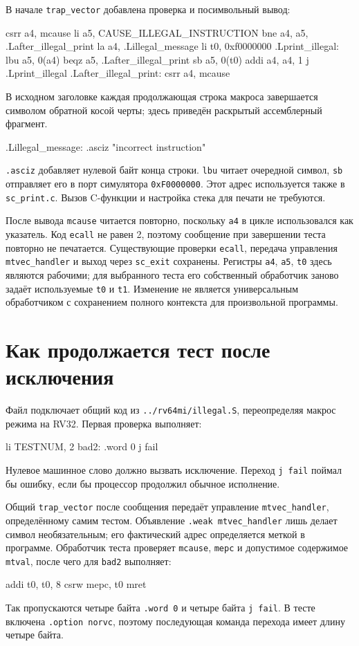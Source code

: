 \documentclass[12pt,a4paper]{article}
\begin{document}
В начале \texttt{trap\_vector} добавлена проверка и посимвольный вывод:
\begin{Code}
csrr a4, mcause
li a5, CAUSE_ILLEGAL_INSTRUCTION
bne a4, a5, .Lafter_illegal_print
la a4, .Lillegal_message
li t0, 0xf0000000
.Lprint_illegal:
    lbu a5, 0(a4)
    beqz a5, .Lafter_illegal_print
    sb a5, 0(t0)
    addi a4, a4, 1
    j .Lprint_illegal
.Lafter_illegal_print:
    csrr a4, mcause
\end{Code}
В исходном заголовке каждая продолжающая строка макроса завершается
символом обратной косой черты; здесь приведён раскрытый ассемблерный фрагмент.

\begin{Code}
.Lillegal_message:
    .asciz "incorrect instruction\n"
\end{Code}
\texttt{.asciz} добавляет нулевой байт конца строки. \texttt{lbu} читает
очередной символ, \texttt{sb} отправляет его в порт симулятора
\texttt{0xF0000000}. Этот адрес используется также в \texttt{sc\_print.c}.
Вызов C-функции и настройка стека для печати не требуются.

После вывода \texttt{mcause} читается повторно, поскольку \texttt{a4}
в цикле использовался как указатель. Код \texttt{ecall} не равен 2,
поэтому сообщение при завершении теста повторно не печатается.
Существующие проверки \texttt{ecall}, передача управления
\texttt{mtvec\_handler} и выход через \texttt{sc\_exit} сохранены.
Регистры \texttt{a4}, \texttt{a5}, \texttt{t0} здесь являются рабочими;
для выбранного теста его собственный обработчик заново задаёт используемые
\texttt{t0} и \texttt{t1}. Изменение не является универсальным обработчиком
с сохранением полного контекста для произвольной программы.

\section{Как продолжается тест после исключения}
Файл  подключает общий
код из \texttt{../rv64mi/illegal.S}, переопределяя макрос режима на RV32.
Первая проверка выполняет:
\begin{Code}
li TESTNUM, 2
bad2:
    .word 0
    j fail
\end{Code}
Нулевое машинное слово должно вызвать исключение. Переход \texttt{j fail}
поймал бы ошибку, если бы процессор продолжил обычное исполнение.

Общий \texttt{trap\_vector} после сообщения передаёт управление
\texttt{mtvec\_handler}, определённому самим тестом.
Объявление \texttt{.weak mtvec\_handler} лишь делает символ необязательным;
его фактический адрес определяется меткой в программе.
Обработчик теста проверяет \texttt{mcause}, \texttt{mepc} и допустимое
содержимое \texttt{mtval}, после чего для \texttt{bad2} выполняет:
\begin{Code}
addi t0, t0, 8
csrw mepc, t0
mret
\end{Code}
Так пропускаются четыре байта \texttt{.word 0} и четыре байта \texttt{j fail}.
В тесте включена \texttt{.option norvc}, поэтому последующая команда
перехода имеет длину четыре байта.
\end{document}
